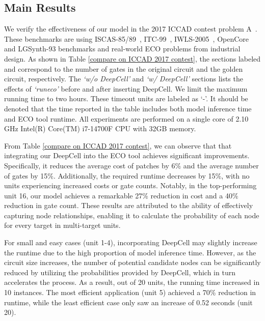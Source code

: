 \subsection{Main Results}
We verify the effectiveness of our model in the 2017 ICCAD contest problem A~\cite{huang20172017}. These benchmarks are using ISCAS-85/89~\cite{brglez1989combinational}, ITC-99~\cite{davidson1999characteristics}, IWLS-2005~\cite{albrecht2005iwls}, OpenCore and LGSynth-93 benchmarks and real-world ECO problems from industrial design. As shown in Table \ref{compare on ICCAD 2017 contest}, the sections labeled  and  correspond to the number of gates in the original circuit and the golden circuit, respectively. The \textit{`w/o DeepCell'} and \textit{`w/ DeepCell'} sections lists the effects of \textit{`runeco'} before and after inserting DeepCell. We limit the maximum running time to two hours. These timeout units are labeled as `-'. It should be denoted that the time reported in the table includes both model inference time and ECO tool runtime. All experiments are performed on a single core of 2.10 GHz Intel(R) Core(TM) i7-14700F CPU with 32GB memory. 

From Table \ref{compare on ICCAD 2017 contest}, we can observe that that integrating our DeepCell into the ECO tool achieves significant improvements. Specifically, it reduces the average cost of patches by 6\% and the average number of gates by 15\%. Additionally, the required runtime decreases by 15\%, with no units experiencing increased costs or gate counts. Notably, in the top-performing unit 16, our model achieves a remarkable 27\% reduction in cost and a 40\% reduction in gate count. These results are attributed to the ability of effectively capturing node relationships, enabling it to calculate the probability of each node for every target in multi-target units. %

For small and easy cases (unit 1-4), incorporating DeepCell may slightly increase the runtime due to the high proportion of model inference time. However, as the circuit size increases, the number of potential candidate nodes can be significantly reduced by utilizing the probabilities provided by DeepCell, which in turn accelerates the process. As a result, out of 20 units, the running time increased in 10 instances. The most efficient application (unit 5) achieved a 70\% reduction in runtime, while the least efficient case only saw an increase of 0.52 seconds (unit 20).

